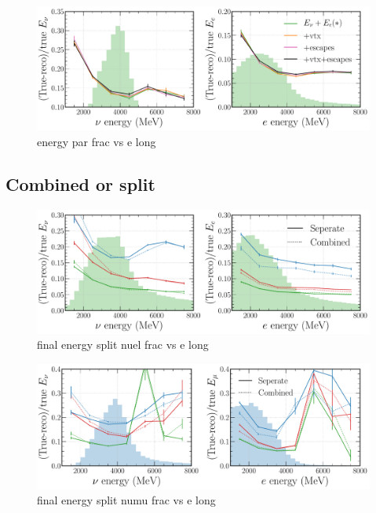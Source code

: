 \begin{figure} %
    \includegraphics[width=\textwidth]{diagrams/6-cvn/chipsnet/energy_par_frac_vs_e.pdf}
    \caption[energy par frac vs e short]
    {energy par frac vs e long}
    \label{fig:energy_par_frac_vs_e}
\end{figure}

\subsection{Combined or split} %
\label{sec:cvn_energy_split} %

\begin{figure} %
    \includegraphics[width=\textwidth]{diagrams/6-cvn/chipsnet/final_energy_split_nuel_frac_vs_e.pdf}
    \caption[final energy split nuel frac vs e short]
    {final energy split nuel frac vs e long}
    \label{fig:final_energy_split_nuel_frac_vs_e}
\end{figure}

\begin{figure} %
    \includegraphics[width=\textwidth]{diagrams/6-cvn/chipsnet/final_energy_split_numu_frac_vs_e.pdf}
    \caption[final energy split numu frac vs e short]
    {final energy split numu frac vs e long}
    \label{fig:final_energy_split_numu_frac_vs_e}
\end{figure}

